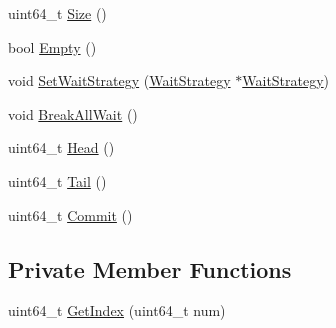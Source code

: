 \begin{DoxyCompactItemize}
\item 
uint64\-\_\-t \hyperlink{classapollo_1_1cyber_1_1base_1_1BoundedQueue_a05e943aa86950fd3ed422cbd75e8a458}{Size} ()
\item 
bool \hyperlink{classapollo_1_1cyber_1_1base_1_1BoundedQueue_a7de0b45b5ea30ec7af76385baa2431b6}{Empty} ()
\item 
void \hyperlink{classapollo_1_1cyber_1_1base_1_1BoundedQueue_ae7da6c10b79cfb65a1135b5a8502dadb}{Set\-Wait\-Strategy} (\hyperlink{classapollo_1_1cyber_1_1base_1_1WaitStrategy}{Wait\-Strategy} $\ast$\hyperlink{classapollo_1_1cyber_1_1base_1_1WaitStrategy}{Wait\-Strategy})
\item 
void \hyperlink{classapollo_1_1cyber_1_1base_1_1BoundedQueue_ad99770e53baaee283b6f1a8b94c6fe24}{Break\-All\-Wait} ()
\item 
uint64\-\_\-t \hyperlink{classapollo_1_1cyber_1_1base_1_1BoundedQueue_a825734364aeb208103c337ac10af8f97}{Head} ()
\item 
uint64\-\_\-t \hyperlink{classapollo_1_1cyber_1_1base_1_1BoundedQueue_a70d560976becd0eae0351bf62df5833f}{Tail} ()
\item 
uint64\-\_\-t \hyperlink{classapollo_1_1cyber_1_1base_1_1BoundedQueue_a6da695b0d88188df69312d8b4c2fac9f}{Commit} ()
\end{DoxyCompactItemize}
\subsection*{Private Member Functions}
\begin{DoxyCompactItemize}
\item 
uint64\-\_\-t \hyperlink{classapollo_1_1cyber_1_1base_1_1BoundedQueue_ad61a734caa076be4afc41fcc198d4922}{Get\-Index} (uint64\-\_\-t num)
\end{DoxyCompactItemize}
